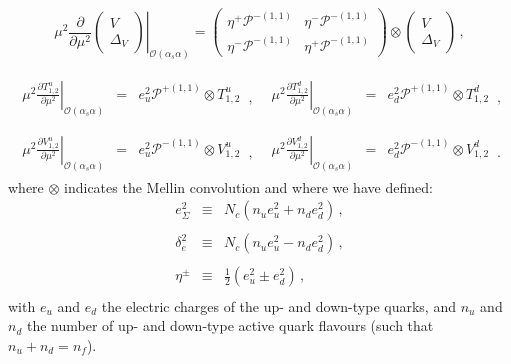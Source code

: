 \begin{equation}
\displaystyle\left.\mu^2\frac{\partial}{\partial \mu^2}
\begin{pmatrix}
V\\
\Delta_V
\end{pmatrix} \right|_{\mathcal{O}(\alpha_s \alpha)}= 
\begin{pmatrix}
\eta^+\mathcal{P}^{-(1,1)} & \eta^-\mathcal{P}^{-(1,1)} \\
\eta^-\mathcal{P}^{-(1,1)} & \eta^+\mathcal{P}^{-(1,1)} 
\end{pmatrix}\otimes
\begin{pmatrix}
V\\
\Delta_V
\end{pmatrix}\,,
\end{equation}

\begin{equation}
\begin{array}{ll}
\begin{array}{rcl}
\displaystyle \left.\mu^2\frac{\partial T^u_{1,2}}{\partial \mu^2}\right|_{\mathcal{O}(\alpha_s \alpha)} &=&
\displaystyle e_u^2\mathcal{P}^{+(1,1)}\otimes T^u_{1,2}
\end{array}\,, &
\begin{array}{rcl}
\displaystyle \left.\mu^2\frac{\partial T^d_{1,2}}{\partial \mu^2}\right|_{\mathcal{O}(\alpha_s \alpha)} &=&
\displaystyle e_d^2\mathcal{P}^{+(1,1)} \otimes T^d_{1,2}
\end{array}\,,
\\
\\
\begin{array}{rcl}
\displaystyle \left.\mu^2\frac{\partial V^u_{1,2}}{\partial \mu^2}\right|_{\mathcal{O}(\alpha_s \alpha)} &=&
\displaystyle e_u^2\mathcal{P}^{-(1,1)} \otimes V^u_{1,2}
\end{array}\,, &
\begin{array}{rcl}
\displaystyle \left.\mu^2\frac{\partial V^d_{1,2}}{\partial \mu^2}\right|_{\mathcal{O}(\alpha_s \alpha)} &=&
\displaystyle e_d^2\mathcal{P}^{-(1,1)}\otimes V^d_{1,2}
\end{array}\,.
\end{array}
\end{equation}
where $\otimes$ indicates the Mellin convolution and where we have
defined:
\begin{equation}
\begin{array}{rcl}
e_{\Sigma}^{2}& \equiv &\displaystyle
N_c(n_ue_{u}^{2}+n_de_{d}^{2})\,,\\
\\
\delta_e^2 & \equiv &\displaystyle N_c(n_u e_u^2 -n_d e_d^2)\,,\\
\\
\eta^{\pm} & \equiv & \displaystyle \frac{1}{2}\left(e_{u}^{2}\pm
  e_{d}^{2}\right)\,,\\
\end{array}
\end{equation}
with $e_u$ and $e_d$ the electric charges of the up- and down-type
quarks, and $n_u$ and $n_d$ the number of up- and down-type active
quark flavours (such that $n_u+n_d=n_f$).

